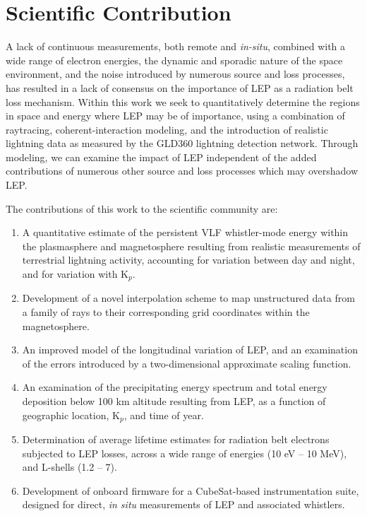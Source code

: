 % 

\section{Scientific Contribution}
A lack of continuous measurements, both remote and \emph{in-situ}, combined with a wide range of electron energies, the dynamic and sporadic nature of the space environment, and the noise introduced by numerous source and loss processes, has resulted in a lack of consensus on the importance of LEP as a radiation belt loss mechanism. Within this work we seek to quantitatively determine the regions in space and energy where LEP may be of importance, using a combination of raytracing, coherent-interaction modeling, and the introduction of realistic lightning data as measured by the GLD360 lightning detection network. Through modeling, we can examine the impact of LEP independent of the added contributions of numerous other source and loss processes which may overshadow LEP.

The contributions of this work to the scientific community are:
\begin{enumerate}
\item A quantitative estimate of the persistent VLF whistler-mode energy within the plasmasphere and magnetosphere resulting from realistic measurements of terrestrial lightning activity, accounting for variation between day and night, and for variation with K$_p$.

\item Development of a novel interpolation scheme to map unstructured data from a family of rays to their corresponding grid coordinates within the magnetosphere.

\item An improved model of the longitudinal variation of LEP, and an examination of the errors introduced by a two-dimensional approximate scaling function.

\item An examination of the precipitating energy spectrum and total energy deposition below 100 km altitude resulting from LEP, as a function of geographic location, K$_p$, and time of year.

\item Determination of average lifetime estimates for radiation belt electrons subjected to LEP losses, across a wide range of energies (10 eV -- 10 MeV), and L-shells (1.2 -- 7).

\item Development of onboard firmware for a CubeSat-based instrumentation suite, designed for direct, \emph{in situ} measurements of LEP and associated whistlers.
\end{enumerate}

